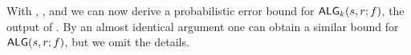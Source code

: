


With , , and  we can now derive a probabilistic error bound for $\textsf{\textup{ALG}}_k(s,r;f)$, the output of . By an almost identical argument one can obtain a similar bound for $\textsf{\textup{ALG}}(s,r;f)$, but we omit the details. 


